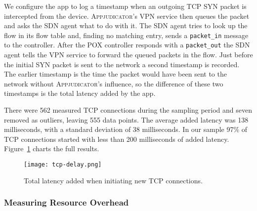 We configure the app to log a timestamp when an outgoing TCP SYN packet is
intercepted from the device. \textsc{Appjudicator}'s VPN service then queues the
packet and asks the SDN agent what to do with it. The SDN agent tries to look up
the flow in its flow table and, finding no matching entry, sends a
\texttt{packet\_in} message to the controller. After the POX controller responds
with a \texttt{packet\_out} the SDN agent tells the VPN service to forward the
queued packets in the flow. Just before the initial SYN packet is sent to the
network a second timestamp is recorded. The earlier timestamp is the time the
packet would have been sent to the network without \textsc{Appjudicator}'s
influence, so the difference of these two timestamps is the total latency added
by the app.

There were 562 measured TCP connections during the sampling period and seven
removed as outliers, leaving 555 data points. The average added latency was 138
milliseconds, with a standard deviation of 38 milliseconds. In our sample 97\%
of TCP connections started with less than 200 milliseconds of added latency.
Figure~\ref{fig:tcp-delay-chart} charts the full results.

\begin{figure}[h]
    \centering
    \texttt{[image: tcp-delay.png]}
    \caption{Total latency added when initiating new TCP connections.}
	\label{fig:tcp-delay-chart}
\end{figure}

\subsubsection{Measuring Resource Overhead}
\label{sec:measuring-resource-overhead}


\newpage
